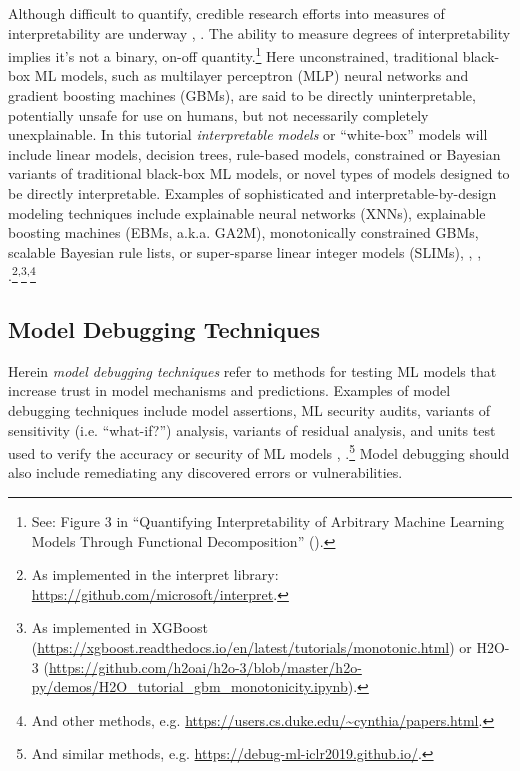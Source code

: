 \documentclass[sigconf]{acmart}
\begin{document}
Although difficult to quantify, credible research efforts into measures of interpretability are underway \cite{friedler2019assessing}, \cite{molnar2019quantifying}. The ability to measure degrees of interpretability implies it's not a binary, on-off quantity.\footnote{See: Figure 3 in ``Quantifying Interpretability of Arbitrary Machine Learning Models Through Functional Decomposition'' (\citet{molnar2019quantifying}).} Here unconstrained, traditional black-box ML models, such as multilayer perceptron (MLP) neural networks and gradient boosting machines (GBMs), are said to be directly uninterpretable, potentially unsafe for use on humans, but not necessarily completely unexplainable. In this tutorial \textit{interpretable models} or ``white-box'' models will include linear models, decision trees, rule-based models, constrained or Bayesian variants of traditional black-box ML models, or novel types of models designed to be directly interpretable. Examples of sophisticated and interpretable-by-design modeling techniques include explainable neural networks (XNNs), explainable boosting machines (EBMs, a.k.a. GA2M), monotonically constrained GBMs, scalable Bayesian rule lists, or super-sparse linear integer models (SLIMs), \cite{slim}, \cite{wf_xnn}, \cite{sbrl}.\footnote{As implemented in the interpret library: \url{https://github.com/microsoft/interpret}.}\textsuperscript{,}\footnote{As implemented in XGBoost (\url{https://xgboost.readthedocs.io/en/latest/tutorials/monotonic.html}) or H2O-3 (\url{https://github.com/h2oai/h2o-3/blob/master/h2o-py/demos/H2O_tutorial_gbm_monotonicity.ipynb}).}\textsuperscript{,}\footnote{And other methods, e.g. \url{https://users.cs.duke.edu/~cynthia/papers.html}.}

\subsection{Model Debugging Techniques}

Herein \textit{model debugging techniques} refer to methods for testing ML models that increase trust in model mechanisms and predictions. Examples of model debugging techniques include model assertions, ML security audits, variants of sensitivity (i.e. ``what-if?'') analysis, variants of residual analysis, and units test used to verify the accuracy or security of ML models \cite{modeltracker}, \cite{kangdebugging}.\footnote{And similar methods, e.g. \url{https://debug-ml-iclr2019.github.io/}.} Model debugging should also include remediating any discovered errors or vulnerabilities. 
\end{document}
